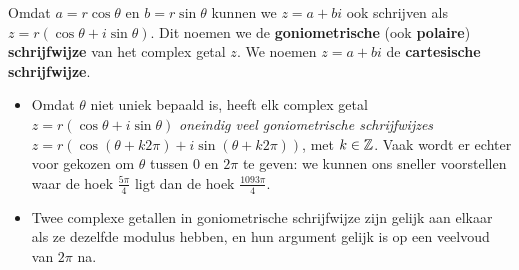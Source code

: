 \documentclass{ximera}
\begin{document}

%



Omdat $a=r \cos \theta$ en $b=r \sin \theta$ kunnen we $z=a+bi$ ook schrijven als $z=r(\cos\theta+i\sin\theta)$. Dit noemen we de \textbf{goniometrische} (ook \textbf{polaire}) \textbf{schrijfwijze} van het complex getal $z$. We noemen $z=a+bi$ de \textbf{cartesische schrijfwijze}.



\begin{remark}\nl
    
    \begin{itemize}
        \item Omdat $\theta$ niet uniek bepaald is, heeft elk complex getal $z = r(\cos\theta+i\sin\theta)$ \textit{oneindig veel goniometrische schrijfwijzes} $z = r\left(\cos(\theta+k2\pi)+i\sin(\theta+k2\pi) \right)$, met $k\in\mathbb{Z}$. Vaak wordt er echter voor gekozen om $\theta$ tussen 0 en $2\pi$ te geven: we kunnen ons sneller voorstellen waar de hoek $\frac{5\pi}{4}$ ligt dan de hoek $\frac{1093\pi}{4}$. 
        \item Twee complexe getallen in goniometrische schrijfwijze zijn gelijk aan elkaar als ze dezelfde modulus hebben, en hun argument gelijk is op een veelvoud van $2\pi$ na.
    \end{itemize}
    
\end{remark}
\end{document}
